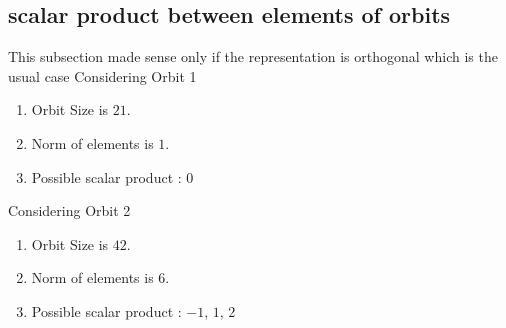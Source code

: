 \documentclass[12pt]{article}
\begin{document}
\subsection{scalar product between elements of orbits}
\noindent This subsection made sense only if the representation is orthogonal which is the usual case
Considering Orbit 1
\begin{enumerate}
\item Orbit Size is $21$.
\item Norm of elements is $1$.
\item Possible scalar product : $0$
\end{enumerate}
Considering Orbit 2
\begin{enumerate}
\item Orbit Size is $42$.
\item Norm of elements is $6$.
\item Possible scalar product : $-1$, $1$, $2$
\end{enumerate}
\end{document}
